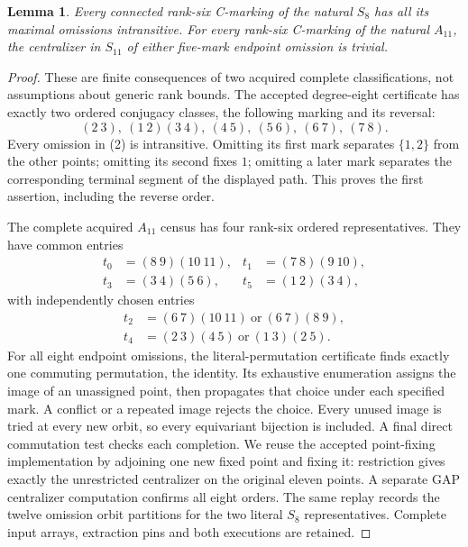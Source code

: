 \documentclass[11pt,a4paper]{article}
\newtheorem{lemma}{Lemma}
\begin{document}
\begin{lemma}\label{small}
Every connected rank-six C-marking of the natural $S_8$ has
all its maximal omissions intransitive. For every rank-six
C-marking of the natural $A_{11}$, the centralizer in $S_{11}$
of either five-mark endpoint omission is trivial.
\end{lemma}
\begin{proof}
These are finite consequences of two acquired complete
classifications, not assumptions about generic rank bounds.
The accepted degree-eight certificate has exactly two ordered
conjugacy classes, the following marking and its reversal:
\[
 (2\ 3),\ (1\ 2)(3\ 4),\ (4\ 5),\ (5\ 6),\ (6\ 7),\ (7\ 8).
                                                               \tag{2}
\]
Every omission in (2) is intransitive. Omitting its first mark
separates $\{1,2\}$ from the other points; omitting its second
fixes $1$; omitting a later mark separates the corresponding
terminal segment of the displayed path. This proves the first
assertion, including the reverse order.

The complete acquired $A_{11}$ census has four rank-six
ordered representatives. They have common entries
\[
\begin{aligned}
t_0&=(8\ 9)(10\ 11),&t_1&=(7\ 8)(9\ 10),\\
t_3&=(3\ 4)(5\ 6),&t_5&=(1\ 2)(3\ 4),
\end{aligned}
\]
with independently chosen entries
\[
\begin{split}
t_2&=(6\ 7)(10\ 11)\ \text{or}\ (6\ 7)(8\ 9),\\
t_4&=(2\ 3)(4\ 5)\ \text{or}\ (1\ 3)(2\ 5).
\end{split}
                                                               \tag{3}
\]
For all eight endpoint omissions, the literal-permutation
certificate finds exactly one commuting permutation, the
identity. Its exhaustive enumeration assigns the image of an
unassigned point, then propagates that choice under each
specified mark. A conflict or a repeated image rejects the
choice. Every unused image is tried at every new orbit, so
every equivariant bijection is included. A final direct
commutation test checks each completion. We reuse the accepted
point-fixing implementation by adjoining one new fixed point
and fixing it: restriction gives exactly the unrestricted
centralizer on the original eleven points. A separate GAP
centralizer computation confirms all eight orders. The same
replay records the twelve omission orbit partitions for the
two literal $S_8$ representatives. Complete input arrays,
extraction pins and both executions are retained.
\end{proof}
\end{document}
